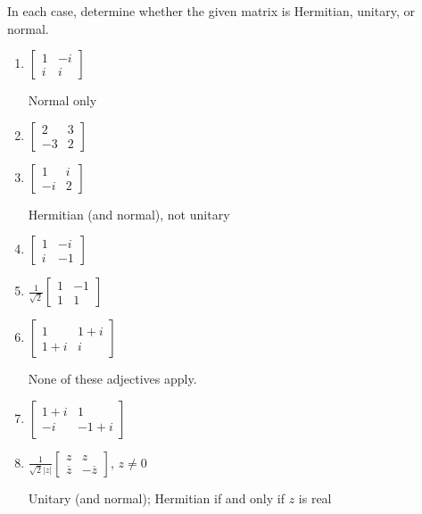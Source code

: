 \documentclass{ximera}
\begin{document}
\begin{problem}\label{prb:complex_matrices5}
In each case, determine whether the given matrix is Hermitian, unitary, or normal.

\begin{enumerate}
\item $\left[ \begin{array}{rr}
1 & -i \\
i & i
\end{array}\right]$
\begin{hint}
Normal only
\end{hint}

\item $\left[ \begin{array}{rr}
2 & 3 \\
-3 & 2
\end{array}\right]$

\item $\left[ \begin{array}{rr}
1 & i \\
-i & 2
\end{array}\right]$
\begin{hint}
Hermitian (and normal), not unitary
\end{hint}

\item $\left[ \begin{array}{rr}
1 & -i \\
i & -1
\end{array}\right]$

\item $\frac{1}{\sqrt{2}} \left[ \begin{array}{rr}
1 & -1 \\
1 & 1
\end{array}\right]$

\item $\left[ \begin{array}{cc}
1 & 1 + i \\
1 + i & i
\end{array}\right]$
\begin{hint}
None of these adjectives apply.
\end{hint}

\item $\left[ \begin{array}{cc}
1 + i & 1 \\
-i & -1 + i
\end{array}\right]$

\item $\frac{1}{\sqrt{2}|z|}\left[ \begin{array}{rr}
z & z \\
\overline{z} & -\overline{z}
\end{array}\right]$, $z \neq 0$
\begin{hint}
Unitary (and normal); Hermitian if and only if $z$ is real
\end{hint}

\end{enumerate}
\end{problem}
\end{document}
